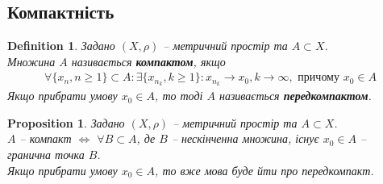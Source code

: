 \documentclass[a4paper, 10pt]{article}
\theoremstyle{theoremdd}
\theoremstyle{theoremdd}
\newtheorem{definition}[theorem]{Definition}
\theoremstyle{theoremdd}
\theoremstyle{theoremdd}
\theoremstyle{theoremdd}
\newtheorem{proposition}[theorem]{Proposition}
\theoremstyle{theoremdd}
\theoremstyle{theoremdd}
\theoremstyle{theoremdd}
\begin{document}
\subsection{Компактність}
\begin{definition}
Задано $(X,\rho)$ -- метричний простір та $A \subset X$.\\
Множина $A$ називається \textbf{компактом}, якщо
\begin{align*}
\forall \{x_n, n \geq 1\} \subset A: \exists \{x_{n_k}, k \geq 1\}: x_{n_k} \to x_0, k \to \infty, \text{ причому } x_0 \in A
\end{align*}
Якщо прибрати умову $x_0 \in A$, то тоді $A$ називається \textbf{передкомпактом}.
\end{definition}

\begin{proposition}
Задано $(X,\rho)$ -- метричний простір та $A \subset X$.\\
$A$ -- компакт $\iff $ $\forall B \subset A$, де $B$ -- нескінченна множина, існує $x_0 \in A$ -- гранична точка $B$.\\
Якщо прибрати умову $x_0 \in A$, то вже мова буде йти про передкомпакт.
\end{proposition}
\end{document}
